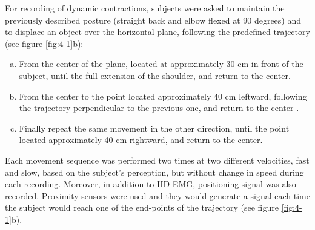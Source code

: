 For recording of dynamic contractions, subjects were asked to maintain the previously described posture (straight back and elbow flexed at 90 degrees) and to displace an object over the horizontal plane, following the predefined trajectory (see figure \ref{fig:4-1}b):

\begin{enumerate}[a)]
\item From the center of the plane, located at approximately 30 cm in front of the subject, until the full extension of the shoulder, and return to the center.
\item From the center to the point located approximately 40 cm leftward, following the trajectory perpendicular to the previous one, and return to the center .
\item Finally repeat the same movement in the other direction, until the point located approximately 40 cm rightward, and return to the center.
\end{enumerate}

Each movement sequence was performed two times at two different velocities, fast and slow, based on the subject's perception, but without change in speed during each recording. Moreover, in addition to HD-EMG, positioning signal was also recorded. Proximity sensors were used and they would generate a signal each time the subject would reach one of the end-points of the trajectory (see figure \ref{fig:4-1}b).

